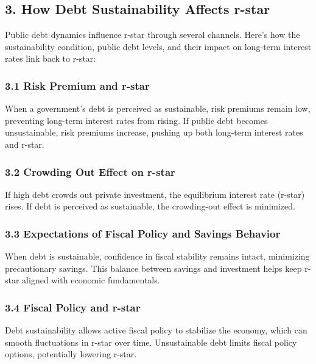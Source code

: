 \documentclass[
  letterpaper,
  DIV=11,
  numbers=noendperiod]{scrartcl}
\begin{document}
\subsection{3. How Debt Sustainability Affects
r-star}\label{how-debt-sustainability-affects-r-star}

Public debt dynamics influence r-star through several channels. Here's
how the sustainability condition, public debt levels, and their impact
on long-term interest rates link back to r-star:

\subsubsection{3.1 Risk Premium and
r-star}\label{risk-premium-and-r-star}

When a government's debt is perceived as sustainable, risk premiums
remain low, preventing long-term interest rates from rising. If public
debt becomes unsustainable, risk premiums increase, pushing up both
long-term interest rates and r-star.

\subsubsection{3.2 Crowding Out Effect on
r-star}\label{crowding-out-effect-on-r-star}

If high debt crowds out private investment, the equilibrium interest
rate (r-star) rises. If debt is perceived as sustainable, the
crowding-out effect is minimized.

\subsubsection{3.3 Expectations of Fiscal Policy and Savings
Behavior}\label{expectations-of-fiscal-policy-and-savings-behavior}

When debt is sustainable, confidence in fiscal stability remains intact,
minimizing precautionary savings. This balance between savings and
investment helps keep r-star aligned with economic fundamentals.

\subsubsection{3.4 Fiscal Policy and
r-star}\label{fiscal-policy-and-r-star}

Debt sustainability allows active fiscal policy to stabilize the
economy, which can smooth fluctuations in r-star over time.
Unsustainable debt limits fiscal policy options, potentially lowering
r-star.
\end{document}
